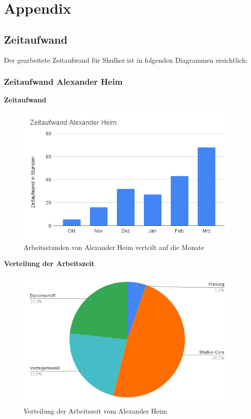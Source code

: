 \chapter{Appendix}
\section{Zeitaufwand}
Der gearbeitete Zeitaufwand für Shulker ist in folgenden Diagrammen ersichtlich:

\subsection{Zeitaufwand Alexander Heim}
\textbf{Zeitaufwand}
\begin{figure}[H]
    \begin{center}
        \includegraphics[width=.75\textwidth]{images/appendix/ZeitaufwandHeim.png}
        \caption{Arbeitsstunden von Alexander Heim verteilt auf die Monate}
    \end{center}
\end{figure}

\textbf{Verteilung der Arbeitszeit}
\begin{figure}[H]
    \begin{center}
        \includegraphics[width=.75\textwidth]{images/appendix/AufteilungHeim.png}
        \caption{Verteilung der Arbeitszeit vom Alexander Heim}
    \end{center}
\end{figure}

